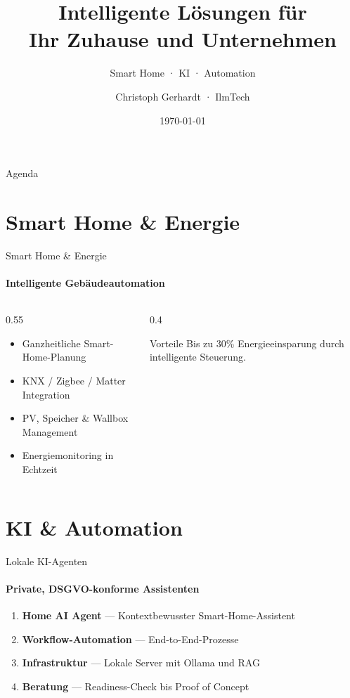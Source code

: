 \documentclass[aspectratio=169, handout]{beamer}
\title{Intelligente Lösungen für\\Ihr Zuhause und Unternehmen}
\subtitle{Smart Home · KI · Automation}
\author{Christoph Gerhardt · IlmTech}
\date{\today}
\begin{document}
\begin{frame}[plain]
  \titlepage
\end{frame}

\begin{frame}{Agenda}
  \tableofcontents
\end{frame}

\section{Smart Home \& Energie}

\begin{frame}{Smart Home \& Energie}
  \framesubtitle{Intelligente Gebäudeautomation}
  \begin{columns}[T]
    \begin{column}{0.55\textwidth}
      \begin{itemize}
        \item Ganzheitliche Smart-Home-Planung
        \item KNX / Zigbee / Matter Integration
        \item PV, Speicher \& Wallbox Management
        \item Energiemonitoring in Echtzeit
      \end{itemize}
    \end{column}
    \begin{column}{0.4\textwidth}
      \begin{block}{Vorteile}
        Bis zu \alert{30\%} Energieeinsparung durch intelligente Steuerung.
      \end{block}
    \end{column}
  \end{columns}
\end{frame}

\section{KI \& Automation}

\begin{frame}{Lokale KI-Agenten}
  \framesubtitle{Private, DSGVO-konforme Assistenten}
  \begin{enumerate}
    \item \textbf{Home AI Agent} — Kontextbewusster Smart-Home-Assistent
    \item \textbf{Workflow-Automation} — End-to-End-Prozesse
    \item \textbf{Infrastruktur} — Lokale Server mit Ollama und RAG
    \item \textbf{Beratung} — Readiness-Check bis Proof of Concept
  \end{enumerate}
\end{frame}
\end{document}
